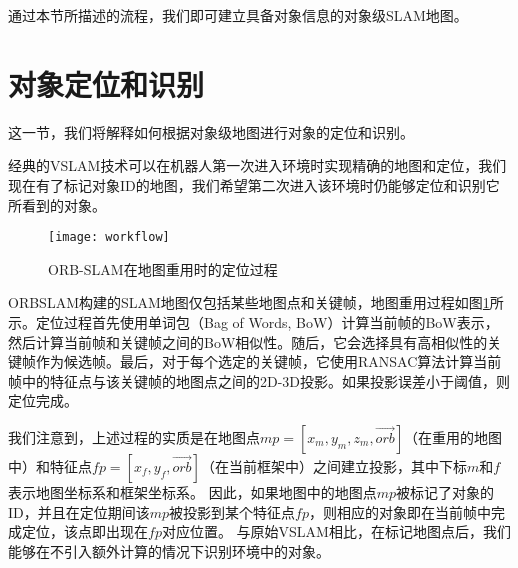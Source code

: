 通过本节所描述的流程，我们即可建立具备对象信息的对象级SLAM地图。

\section{对象定位和识别}
这一节，我们将解释如何根据对象级地图进行对象的定位和识别。

经典的VSLAM\cite{mur2017orb,engel2014lsd}技术可以在机器人第一次进入环境时实现精确的地图和定位，我们现在有了标记对象ID的地图，我们希望第二次进入该环境时仍能够定位和识别它所看到的对象。

\begin{figure}[htbp]
  \centering
  \texttt{[image: workflow]}
  \caption{ORB-SLAM\cite{mur2017orb}在地图重用时的定位过程}
  \label{fig:localization}
\end{figure}

ORBSLAM\cite{mur2017orb}构建的SLAM地图仅包括某些地图点和关键帧，地图重用过程如图\ref{fig:localization}所示。定位过程首先使用单词包（Bag of Words, BoW）\cite{galvez2012bags}计算当前帧的BoW表示，然后计算当前帧和关键帧之间的BoW相似性。随后，它会选择具有高相似性的关键帧作为候选帧。最后，对于每个选定的关键帧，它使用RANSAC\cite{derpanis2010overview}算法计算当前帧中的特征点与该关键帧的地图点之间的2D-3D投影。如果投影误差小于阈值，则定位完成。

我们注意到，上述过程的实质是在地图点$mp = [x_m,y_m,z_m,\vec{orb}]$（在重用的地图中）和特征点$fp = [x_f,y_f,\vec{orb}]$（在当前框架中）之间建立投影，其中下标$m$和$f$表示地图坐标系和框架坐标系。
因此，如果地图中的地图点$mp$被标记了对象的ID，并且在定位期间该$mp$被投影到某个特征点$fp$，则相应的对象即在当前帧中完成定位，该点即出现在$fp$对应位置。
与原始VSLAM相比，在标记地图点后，我们能够在不引入额外计算的情况下识别环境中的对象。


